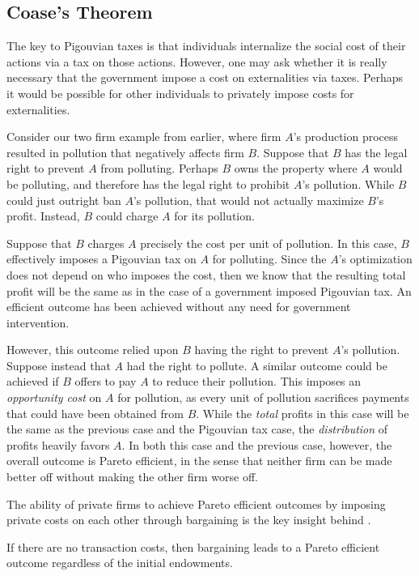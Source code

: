 \subsection*{Coase's Theorem}
The key to Pigouvian taxes is that individuals internalize the social cost of their actions via a tax on those actions. However, one may ask whether it is really necessary that the government impose a cost on externalities via taxes. Perhaps it would be possible for other individuals to privately impose costs for externalities.

Consider our two firm example from earlier, where firm $A$'s production process resulted in pollution that negatively affects firm $B$. Suppose that $B$ has the legal right to prevent $A$ from polluting. Perhaps $B$ owns the property where $A$ would be polluting, and therefore has the legal right to prohibit $A$'s pollution. While $B$ could just outright ban $A$'s pollution, that would not actually maximize $B$'s profit. Instead, $B$ could charge $A$ for its pollution.

Suppose that $B$ charges $A$ precisely the cost per unit of pollution. In this case, $B$ effectively imposes a Pigouvian tax on $A$ for polluting. Since the $A$'s optimization does not depend on who imposes the cost, then we know that the resulting total profit will be the same as in the case of a government imposed Pigouvian tax. An efficient outcome has been achieved without any need for government intervention.

However, this outcome relied upon $B$ having the right to prevent $A$'s pollution. Suppose instead that $A$ had the right to pollute. A similar outcome could be achieved if $B$ offers to pay $A$ to reduce their pollution. This imposes an \emph{opportunity cost} on $A$ for pollution, as every unit of pollution sacrifices payments that could have been obtained from $B$. While the \emph{total} profits in this case will be the same as the previous case and the Pigouvian tax case, the \emph{distribution} of profits heavily favors $A$. In both this case and the previous case, however, the overall outcome is Pareto efficient, in the sense that neither firm can be made better off without making the other firm worse off. 

The ability of private firms to achieve Pareto efficient outcomes by imposing private costs on each other through bargaining is the key insight behind .
\begin{theorem*}
    If there are no transaction costs, then bargaining leads to a Pareto efficient outcome regardless of the initial endowments. 
\end{theorem*}

